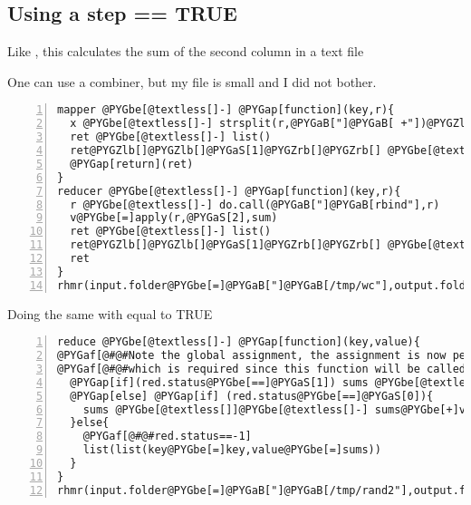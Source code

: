 \documentclass[letterpaper,10pt,english]{manual}
\begin{document}
\subsection{Using a step == TRUE}

Like , this calculates the sum of the second column in a text file

One can use a combiner, but my file is small and I did not bother.

\begin{Verbatim}[commandchars=@\[\],numbers=left,firstnumber=1,stepnumber=1]
mapper @PYGbe[@textless[]-] @PYGap[function](key,r){
  x @PYGbe[@textless[]-] strsplit(r,@PYGaB["]@PYGaB[ +"])@PYGZlb[]@PYGZlb[]@PYGaS[1]@PYGZrb[]@PYGZrb[]
  ret @PYGbe[@textless[]-] list()
  ret@PYGZlb[]@PYGZlb[]@PYGaS[1]@PYGZrb[]@PYGZrb[] @PYGbe[@textless[]-] list(key @PYGbe[=] x@PYGZlb[]@PYGaS[1]@PYGZrb[], value @PYGbe[=] as.numeric(x@PYGZlb[]@PYGaS[2]@PYGZrb[]))
  @PYGap[return](ret)
}
reducer @PYGbe[@textless[]-] @PYGap[function](key,r){
  r @PYGbe[@textless[]-] do.call(@PYGaB["]@PYGaB[rbind"],r)
  v@PYGbe[=]apply(r,@PYGaS[2],sum)
  ret @PYGbe[@textless[]-] list()
  ret@PYGZlb[]@PYGZlb[]@PYGaS[1]@PYGZrb[]@PYGZrb[] @PYGbe[@textless[]-] list(key@PYGbe[=]key,value@PYGbe[=]v)
  ret
}
rhmr(input.folder@PYGbe[=]@PYGaB["]@PYGaB[/tmp/wc"],output.folder@PYGbe[=]@PYGaB["]@PYGaB[/tmp/rand.out"],map@PYGbe[=]mapper,reduce@PYGbe[=]reduce)
\end{Verbatim}

Doing the same with  equal to TRUE

\begin{Verbatim}[commandchars=@\[\],numbers=left,firstnumber=1,stepnumber=1]
reduce @PYGbe[@textless[]-] @PYGap[function](key,value){
@PYGaf[@#@#Note the global assignment, the assignment is now permanent]
@PYGaf[@#@#which is required since this function will be called repeatedly]
  @PYGap[if](red.status@PYGbe[==]@PYGaS[1]) sums @PYGbe[@textless[]]@PYGbe[@textless[]-] @PYGaS[1]
  @PYGap[else] @PYGap[if] (red.status@PYGbe[==]@PYGaS[0]){
    sums @PYGbe[@textless[]]@PYGbe[@textless[]-] sums@PYGbe[+]value
  }else{
    @PYGaf[@#@#red.status==-1]
    list(list(key@PYGbe[=]key,value@PYGbe[=]sums))
  }
}
rhmr(input.folder@PYGbe[=]@PYGaB["]@PYGaB[/tmp/rand2"],output.folder@PYGbe[=]@PYGaB["]@PYGaB[/tmp/rand.out"],map@PYGbe[=]mapper,reduce@PYGbe[=]reduce,step@PYGbe[=]T)
\end{Verbatim}

\resetcurrentobjects
\hypertarget{--doc-FAQ}{}
\end{document}
